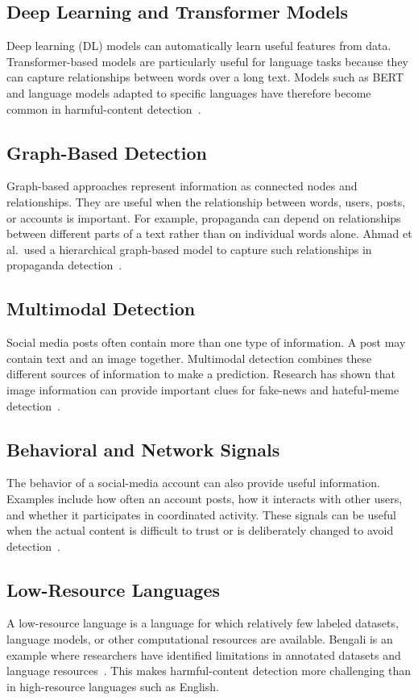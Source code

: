 \documentclass[12pt,a4paper]{report}
\begin{document}
\subsection{Deep Learning and Transformer Models}
Deep learning (DL) models can automatically learn useful features from data.
Transformer-based models are particularly useful for language tasks because they
can capture relationships between words over a long text. Models such as BERT and
language models adapted to specific languages have therefore become common in
harmful-content detection~\cite{duridi2025,lora2023,hasan2026}.

\subsection{Graph-Based Detection}
Graph-based approaches represent information as connected nodes and relationships.
They are useful when the relationship between words, users, posts, or accounts is
important. For example, propaganda can depend on relationships between different
parts of a text rather than on individual words alone. Ahmad et al.\ used a
hierarchical graph-based model to capture such relationships in propaganda
detection~\cite{ahmad2025}.

\subsection{Multimodal Detection}
Social media posts often contain more than one type of information. A post may
contain text and an image together. Multimodal detection combines these different
sources of information to make a prediction. Research has shown that image
information can provide important clues for fake-news and hateful-meme
detection~\cite{lin2024,hee2022}.

\subsection{Behavioral and Network Signals}
The behavior of a social-media account can also provide useful information.
Examples include how often an account posts, how it interacts with other users, and
whether it participates in coordinated activity. These signals can be useful when
the actual content is difficult to trust or is deliberately changed to avoid
detection~\cite{declerck2024,sela2025,schneider2026}.

\subsection{Low-Resource Languages}
A low-resource language is a language for which relatively few labeled datasets,
language models, or other computational resources are available. Bengali is an
example where researchers have identified limitations in annotated datasets and
language resources~\cite{lora2023,hasan2026,romim2022}. This makes harmful-content
detection more challenging than in high-resource languages such as English.
\end{document}
